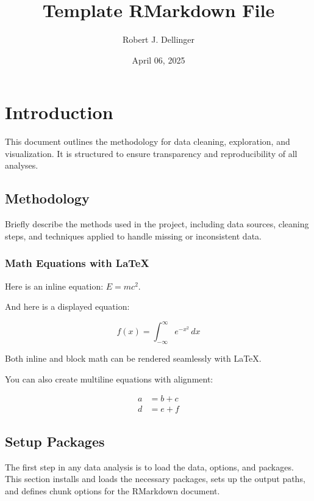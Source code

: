 \documentclass[
  12pt,
]{article}
\title{Template RMarkdown File}
\author{Robert J. Dellinger}
\date{April 06, 2025}
\begin{document}
\maketitle

{
\setcounter{tocdepth}{3}
\tableofcontents
}
\section{Introduction}\label{introduction}

This document outlines the methodology for data cleaning, exploration,
and visualization. It is structured to ensure transparency and
reproducibility of all analyses.

\subsection{Methodology}\label{methodology}

Briefly describe the methods used in the project, including data
sources, cleaning steps, and techniques applied to handle missing or
inconsistent data.

\subsubsection{Math Equations with
LaTeX}\label{math-equations-with-latex}

Here is an inline equation: \(E = mc^2\).

And here is a displayed equation:

\[
f(x) = \int_{-\infty}^{\infty} e^{-x^2} \, dx
\]

Both inline and block math can be rendered seamlessly with LaTeX.

You can also create multiline equations with alignment:

\[
\begin{aligned}
a &= b + c \\
d &= e + f
\end{aligned}
\]

\subsection{Setup Packages}\label{setup-packages}

The first step in any data analysis is to load the data, options, and
packages. This section installs and loads the necessary packages, sets
up the output paths, and defines chunk options for the RMarkdown
document.
\end{document}
